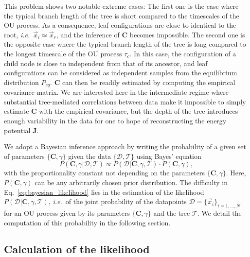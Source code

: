 \documentclass[preprint,amsmath,amssymb,superscriptaddress,showpacs,pre]{revtex4-1}
\newcommand{\ie}{\emph{i.e.}}
\def\vx{\vec x}
\begin{document}
This problem shows two notable extreme cases: 
The first one is the case where the typical branch length of the tree is short compared to the timescales of the OU process.
As a consequence, leaf configurations are close to identical to the root, \ie~$\vx_i\simeq\vx_r$, and the inference of $\bm C$ becomes impossible. 
The second one is the opposite case where the typical branch length of the tree is long compared to the longest timescale of the OU process $\tau_c$.
In this case, the configuration of a child node is close to independent from that of its ancestor, and leaf configurations can be considered as independent samples from the equilibrium distribution $P_{eq}$.
$\bm C$ can then be readily estimated by computing the empirical covariance matrix. 
We are interested here in the intermediate regime where substantial tree-mediated correlations between data
make it impossible to simply estimate $\bm C$ with the empirical covariance, but the depth of the tree introduces enough variability in the data for one to hope of reconstructing the energy potential $\bm{J}$.

We adopt a Bayesian inference approach by writing the probability of a given set of parameters $\{\bm C, \gamma\}$ given the data $\{\mathcal{D},\mathcal{T}\}$ using Bayes' equation
\begin{equation}
	P(\bm C, \gamma\vert\mathcal{D},\mathcal{T}) \propto P(\mathcal{D}\vert\bm C, \gamma,\mathcal{T})\cdot P(\bm C, \gamma),
	\label{eq:bayesian_likelihood}
\end{equation}
with the proportionality constant not depending on the parameters $\{\bm C, \gamma\}$. Here, $P(\bm C, \gamma)$ can be any arbitrarily chosen prior distribution. The difficulty in Eq.~\eqref{eq:bayesian_likelihood} lies in the estimation of the likelihood $P(\mathcal{D}\vert\bm C, \gamma, \mathcal{T})$,
\ie~of the joint probability of the datapoints $\mathcal{D}=\{\vx_i\}_{i=1,...,N}$ for an OU process given by its parameters $\{\bm C, \gamma\}$ and the tree $\mathcal{T}$.  We detail the computation of this probability in the following section. 

\subsection{Calculation of the likelihood} %
\label{sub:Calculation_of_the_likelihood}
 
\end{document}

